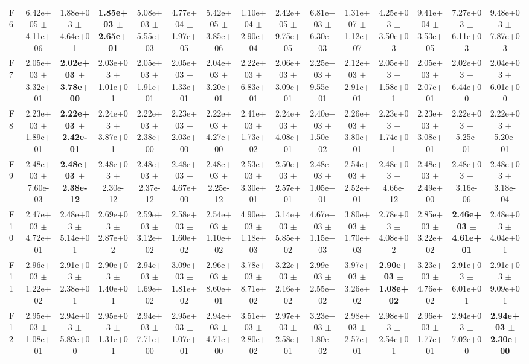 \begin{table}
{\begin{tabular}{lcccccccccccccc}
F6 & 6.42e+05 $\pm$ 4.11e+06 & 1.88e+03 $\pm$ 4.64e+01 & \textbf{1.85e+03 $\pm$ 2.65e+01} & 5.08e+03 $\pm$ 5.55e+03 & 4.77e+04 $\pm$ 1.97e+05 & 5.42e+05 $\pm$ 3.85e+06 & 1.10e+04 $\pm$ 2.90e+04 & 2.42e+05 $\pm$ 9.75e+05 & 6.81e+03 $\pm$ 6.30e+03 & 1.31e+07 $\pm$ 1.12e+07 & 4.25e+03 $\pm$ 3.50e+03 & 9.41e+04 $\pm$ 3.53e+05 & 7.27e+03 $\pm$ 6.11e+03 & 9.48e+03 $\pm$ 7.87e+03 \\
F7 & 2.05e+03 $\pm$ 3.32e+01 & \textbf{2.02e+03 $\pm$ 3.78e+00} & 2.03e+03 $\pm$ 1.01e+01 & 2.05e+03 $\pm$ 1.91e+01 & 2.05e+03 $\pm$ 1.33e+01 & 2.04e+03 $\pm$ 3.20e+01 & 2.22e+03 $\pm$ 6.83e+01 & 2.06e+03 $\pm$ 3.09e+01 & 2.25e+03 $\pm$ 9.55e+01 & 2.12e+03 $\pm$ 2.91e+01 & 2.05e+03 $\pm$ 1.58e+01 & 2.05e+03 $\pm$ 2.07e+01 & 2.02e+03 $\pm$ 6.44e+00 & 2.04e+03 $\pm$ 6.01e+00 \\
F8 & 2.23e+03 $\pm$ 1.89e+01 & \textbf{2.22e+03 $\pm$ 2.42e-01} & 2.24e+03 $\pm$ 3.87e+01 & 2.22e+03 $\pm$ 2.38e+00 & 2.23e+03 $\pm$ 2.03e+00 & 2.22e+03 $\pm$ 4.27e+00 & 2.41e+03 $\pm$ 1.73e+02 & 2.24e+03 $\pm$ 4.08e+01 & 2.40e+03 $\pm$ 1.50e+02 & 2.26e+03 $\pm$ 3.80e+01 & 2.23e+03 $\pm$ 1.74e+01 & 2.23e+03 $\pm$ 3.08e+01 & 2.22e+03 $\pm$ 5.25e-01 & 2.22e+03 $\pm$ 5.20e-01 \\
F9 & 2.48e+03 $\pm$ 7.60e-03 & \textbf{2.48e+03 $\pm$ 2.38e-12} & 2.48e+03 $\pm$ 2.30e-12 & 2.48e+03 $\pm$ 2.37e-12 & 2.48e+03 $\pm$ 4.67e+00 & 2.48e+03 $\pm$ 2.25e-12 & 2.53e+03 $\pm$ 3.30e+01 & 2.50e+03 $\pm$ 2.57e+01 & 2.48e+03 $\pm$ 1.05e+01 & 2.54e+03 $\pm$ 2.52e+01 & 2.48e+03 $\pm$ 4.66e-12 & 2.48e+03 $\pm$ 2.49e+00 & 2.48e+03 $\pm$ 3.16e-06 & 2.48e+03 $\pm$ 3.18e-04 \\
F10 & 2.47e+03 $\pm$ 4.72e+01 & 2.48e+03 $\pm$ 5.14e+01 & 2.69e+03 $\pm$ 2.87e+02 & 2.59e+03 $\pm$ 3.12e+02 & 2.58e+03 $\pm$ 1.60e+02 & 2.54e+03 $\pm$ 1.10e+02 & 4.90e+03 $\pm$ 1.18e+03 & 3.14e+03 $\pm$ 5.85e+02 & 4.67e+03 $\pm$ 1.15e+03 & 3.80e+03 $\pm$ 1.70e+03 & 2.78e+03 $\pm$ 4.08e+02 & 2.85e+03 $\pm$ 3.22e+02 & \textbf{2.46e+03 $\pm$ 4.61e+01} & 2.48e+03 $\pm$ 4.04e+01 \\
F11 & 2.96e+03 $\pm$ 1.22e+02 & 2.91e+03 $\pm$ 2.38e+01 & 2.90e+03 $\pm$ 1.40e+01 & 2.94e+03 $\pm$ 1.69e+02 & 3.09e+03 $\pm$ 1.81e+02 & 2.96e+03 $\pm$ 8.60e+01 & 3.78e+03 $\pm$ 8.71e+02 & 3.22e+03 $\pm$ 2.16e+02 & 2.99e+03 $\pm$ 2.55e+02 & 3.97e+03 $\pm$ 3.26e+02 & \textbf{2.90e+03 $\pm$ 1.08e+02} & 3.23e+03 $\pm$ 4.76e+02 & 2.91e+03 $\pm$ 6.01e+01 & 2.91e+03 $\pm$ 9.09e+01 \\
F12 & 2.95e+03 $\pm$ 1.08e+01 & 2.94e+03 $\pm$ 5.89e+00 & 2.95e+03 $\pm$ 1.31e+01 & 2.94e+03 $\pm$ 7.71e+00 & 2.95e+03 $\pm$ 1.07e+01 & 2.94e+03 $\pm$ 4.71e+00 & 3.51e+03 $\pm$ 2.80e+02 & 2.97e+03 $\pm$ 2.58e+01 & 3.23e+03 $\pm$ 1.80e+02 & 2.98e+03 $\pm$ 2.57e+01 & 2.98e+03 $\pm$ 2.54e+01 & 2.96e+03 $\pm$ 1.77e+01 & 2.94e+03 $\pm$ 7.02e+00 & \textbf{2.94e+03 $\pm$ 2.30e+00} \\
\bottomrule
\end{tabular}%
}
\end{table}
